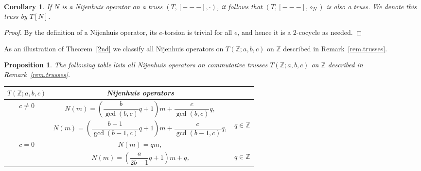 \documentclass[10pt,a4paper]{amsart}
\numberwithin{equation}{section}
\newtheorem{Corollary}[Theorem]{Corollary}
\newtheorem{Proposition}[Theorem]{Proposition}
 { \theoremstyle{definition}
\newtheorem{Definition}[Theorem]{Definition}
\newtheorem{Note}[Theorem]{Note}
\newtheorem{Example}[Theorem]{Example}
\newtheorem{Remark}[Theorem]{Remark}}
\newcommand{\Z}{\mathbb Z}
\begin{document}
\begin{Corollary}\label{cor.Nij}
If $N$ is a Nijenhuis operator on a truss $(T,[---],\cdot)$, it follows that $(T,[---],\circ_{N})$ is also a truss. We denote this truss by $T[N]$.
\end{Corollary}

\begin{proof}
By the definition of a Nijenhuis operator, its $e$-torsion is trivial for all $e$, and hence it is a 2-cocycle as needed.
\end{proof}

As an illustration of Theorem~\ref{2nd} we classify all Nijenhuis operators on $T(\Z;a,b,c)$ on $\Z$ described in Remark~\ref{rem.trusses}.

\begin{Proposition}\label{prop.Nij.z}
The following table lists all Nijenhuis operators on commutative trusses $T(\Z;a,b,c)$ on $\Z$ described in Remark~{\rm \ref{rem.trusses}}.
 \begin{center}\renewcommand{\arraystretch}{1.8}
 \begin{tabular}{| c | c c |}
\hline
 $T(\Z;a,b,c)$ & {\rm Nijenhuis operators} &
 \\
\hline $c\neq 0$
 & $N(m) = \left(\dfrac{b}{\gcd(b,c)} q +1\right)m + \dfrac{c}{\gcd(b,c)} q,$
 &
 \\[1ex]
& $N(m) = \left(\dfrac{b-1}{\gcd(b-1,c)} q +1\right)m + \dfrac{c}{\gcd(b-1,c)} q,$ & $q\in \Z$ \\
\hline $c=0$
 & $N(m) = qm,$
 & {}
 \\
{} & $N(m)= \left(\dfrac{a}{2b-1} q +1\right) m +q $,
 & $q\in \Z$ \\ \hline
 \end{tabular}
 \end{center}
 \end{Proposition}
\end{document}
